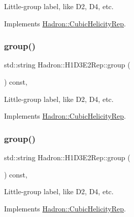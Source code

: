 Little-\/group label, like D2, D4, etc. 

Implements \mbox{\hyperlink{structHadron_1_1CubicHelicityRep_a101a7d76cd8ccdad0f272db44b766113}{Hadron\+::\+Cubic\+Helicity\+Rep}}.

\mbox{\label{structHadron_1_1H1D3E2Rep_aeb5e2d7d6d716039d61a8262627b7853}} 
\subsubsection{\texorpdfstring{group()}{group()}\hspace{0.1cm}{\footnotesize\ttfamily [3/5]}}
{\footnotesize\ttfamily std\+::string Hadron\+::\+H1\+D3\+E2\+Rep\+::group (\begin{DoxyParamCaption}{ }\end{DoxyParamCaption}) const\hspace{0.3cm}{\ttfamily [inline]}, {\ttfamily [virtual]}}

Little-\/group label, like D2, D4, etc. 

Implements \mbox{\hyperlink{structHadron_1_1CubicHelicityRep_a101a7d76cd8ccdad0f272db44b766113}{Hadron\+::\+Cubic\+Helicity\+Rep}}.

\mbox{\label{structHadron_1_1H1D3E2Rep_aeb5e2d7d6d716039d61a8262627b7853}} 
\subsubsection{\texorpdfstring{group()}{group()}\hspace{0.1cm}{\footnotesize\ttfamily [4/5]}}
{\footnotesize\ttfamily std\+::string Hadron\+::\+H1\+D3\+E2\+Rep\+::group (\begin{DoxyParamCaption}{ }\end{DoxyParamCaption}) const\hspace{0.3cm}{\ttfamily [inline]}, {\ttfamily [virtual]}}

Little-\/group label, like D2, D4, etc. 

Implements \mbox{\hyperlink{structHadron_1_1CubicHelicityRep_a101a7d76cd8ccdad0f272db44b766113}{Hadron\+::\+Cubic\+Helicity\+Rep}}.

\mbox{\label{structHadron_1_1H1D3E2Rep_aeb5e2d7d6d716039d61a8262627b7853}} 
